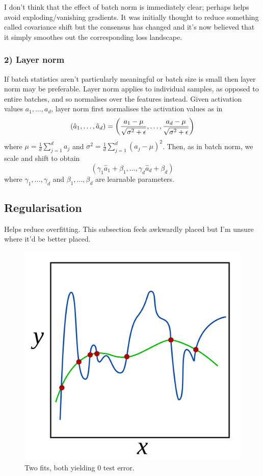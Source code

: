 \documentclass[11pt]{article}
\begin{document}
I don't think that the effect of batch norm is immediately clear; perhaps helps avoid exploding/vanishing gradients. It was initially thought to reduce something called covariance shift but the consensus has changed and it's now believed that it simply smoothes out the corresponding loss landscape.

\subsubsection*{2) Layer norm}
If batch statistics aren't particularly meaningful or batch size is small then layer norm may be preferable. Layer norm applies to individual samples, as opposed to entire batches, and so normalises over the features instead. Given activation values $a_1,\dots,a_d$, layer norm first normalises the activation values as in
$$
(\hat{a}_1,\dots,\hat{a}_d)
=
\left(\frac{a_1-\mu}{\sqrt{\sigma^2+\epsilon}},\dots,\frac{a_d-\mu}{\sqrt{\sigma^2+\epsilon}}\right)
$$
where $\mu=\frac{1}{d}\sum_{j=1}^da_j$ and $\sigma^2=\frac{1}{d}\sum_{j=1}^d(a_j-\mu)^2$. Then, as in batch norm, we scale and shift to obtain
$$
(\gamma_1\hat{a}_1+\beta_1,\dots,\gamma_d\hat{a}_d+\beta_d)
$$
where $\gamma_1,\dots,\gamma_d$ and $\beta_1,\dots,\beta_d$ are learnable parameters.

\subsection{Regularisation}
Helps reduce overfitting. This subsection feels awkwardly placed but I'm unsure where it'd be better placed.

\begin{figure}[t]
    \centering
    \includegraphics[width=0.5\columnwidth]{./figures/supervised_learning/regularisation_two_plots_zero_test_error.png}
    \caption{Two fits, both yielding 0 test error. }
    \label{fig:regularisation_two_plots}
\end{figure}
\end{document}
